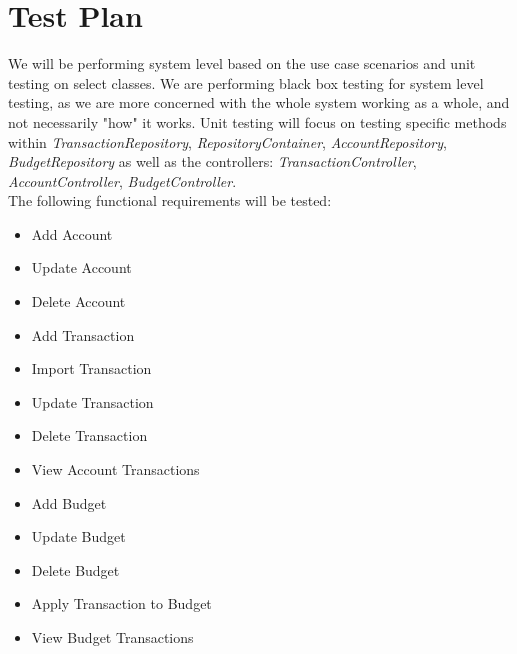\documentclass[12pt]{article}
\begin{document}
\section{Test Plan}

We will be performing system level  based on the use case scenarios and unit testing on select classes.  We are performing black box testing for system level testing, as we are more concerned with the whole system working as a whole, and not necessarily "how" it works. Unit testing will focus on testing specific methods within {\it TransactionRepository}, {\it RepositoryContainer}, {\it AccountRepository}, {\it BudgetRepository} as well as the controllers: {\it TransactionController}, {\it AccountController}, {\it BudgetController}. \\

The following functional requirements will be tested:
\begin{itemize}
\setlength{\parskip}{0.8mm}
	\item Add Account
	\item Update Account
	\item Delete Account
	\item Add Transaction
	\item Import Transaction
	\item Update Transaction
	\item Delete Transaction
	\item View Account Transactions
	\item Add Budget
	\item Update Budget
	\item Delete Budget
	\item Apply Transaction to Budget
	\item View Budget Transactions
\end{itemize}
\clearpage
\end{document}
